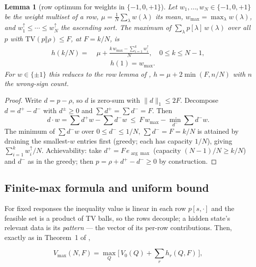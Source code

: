 \documentclass[aps,pra,reprint,superscriptaddress,floatfix]{revtex4-2}
\newcommand{\TV}{\mathrm{TV}}
\newtheorem{lemma}{Lemma}
\begin{document}
\begin{lemma}[row optimum for weights in $\{-1,0,+1\}$]
\label{lem:row}
Let $w_{1},\dots,w_{N}\in\{-1,0,+1\}$ be the weight multiset of a row,
$\mu=\frac1N\sum_{\lambda}w(\lambda)$ its mean, $w_{\max}=\max_{\lambda}
w(\lambda)$, and $w^{\uparrow}_{1}\le\cdots\le w^{\uparrow}_{N}$ the
ascending sort. The maximum of $\sum_{\lambda}p[\lambda]\,w(\lambda)$ over
all $p$ with $\TV(p\Vert\rho)\le F$, at $F=k/N$, is
\begin{equation}
\begin{aligned}
h(k/N)=\;&\mu+\frac{k\,w_{\max}-\sum_{i=1}^{k}w^{\uparrow}_{i}}{N},
\quad 0\le k\le N-1,\\
&\qquad h(1)=w_{\max}.
\end{aligned}
\label{eq:rowopt}
\end{equation}
For $w\in\{\pm 1\}$ this reduces to the row lemma of
\cite{mainpaper2026}, $h=\mu+2\min(F,n/N)$ with $n$ the wrong-sign count.
\end{lemma}

\begin{proof}
Write $d=p-\rho$, so $d$ is zero-sum with $\|d\|_{1}\le 2F$. Decompose
$d=d^{+}-d^{-}$ with $d^{\pm}\ge 0$ and $\sum d^{+}=\sum d^{-}=F$. Then
\begin{equation*}
d\!\cdot\! w=\sum d^{+}w-\sum d^{-}w
\ \le\ F\,w_{\max}-\min_{d^{-}}\sum d^{-}w .
\end{equation*}
The minimum of $\sum d^{-}w$ over $0\le d^{-}\le 1/N$,
$\sum d^{-}=F=k/N$ is attained by draining the smallest-$w$ entries first
(greedy; each has capacity $1/N$), giving $\sum_{i=1}^{k}w^{\uparrow}_{i}/N$.
Achievability: take $d^{+}=F\,e_{\arg\max}$ (capacity $(N-1)/N\ge k/N$) and
$d^{-}$ as in the greedy; then $p=\rho+d^{+}-d^{-}\ge 0$ by construction.
\end{proof}

\subsection{Finite-max formula and uniform bound}

For fixed responses the inequality value is linear in each row
$p[s,\cdot]$ and the feasible set is a product of TV balls, so the rows
decouple; a hidden state's relevant data is its \emph{pattern} --- the
vector of its per-row contributions. Then, exactly as in Theorem~1 of
\cite{mainpaper2026},

\begin{equation}
V_{\max}(N,F)=\max_{Q}\Big[\,V_{0}(Q)+\sum_{r}h_{r}(Q,F)\,\Big],
\label{eq:finmax}
\end{equation}
\end{document}
